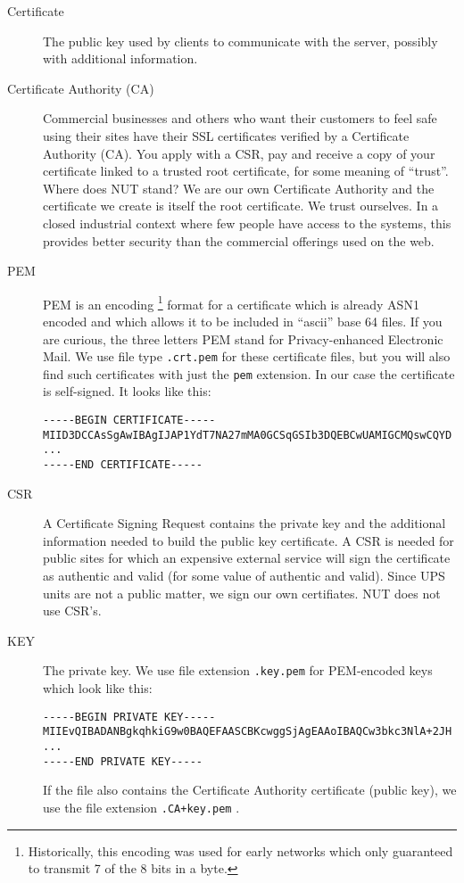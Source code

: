 \documentclass[12pt]{article}
\begin{document}
\begin{description}

\item[Certificate] The public key used by clients to communicate with
  the server, possibly with additional information.
  
\item[Certificate Authority (CA)] Commercial businesses and others who want
  their customers to feel safe using their sites have their SSL certificates
  verified by a Certificate Authority (CA). You apply with a CSR, pay and
  receive a copy of your certificate linked to a trusted root certificate, for
  some meaning of ``trust''.  Where does NUT stand?  We are our own
  Certificate Authority and the certificate we create is itself the root
  certificate.  We trust ourselves.  In a closed industrial context where few
  people have access to the systems, this provides better security than the
  commercial offerings used on the web.
  
\item[PEM] PEM is an encoding \footnote{Historically, this encoding was used
  for early networks which only guaranteed to transmit 7 of the 8 bits in a
  byte.}  format for a certificate which is already ASN1 encoded and which
  allows it to be included in ``ascii'' base 64 files.  If you are curious,
  the three letters PEM stand for Privacy-enhanced Electronic Mail.  We use
  file type \texttt{.crt.pem} for these certificate files, but you will also
  find such certificates with just the \texttt{pem} extension.  In our case
  the certificate is self-signed.  It looks like this:

\small{\begin{verbatim}
-----BEGIN CERTIFICATE-----
MIID3DCCAsSgAwIBAgIJAP1YdT7NA27mMA0GCSqGSIb3DQEBCwUAMIGCMQswCQYD
...
-----END CERTIFICATE-----
\end{verbatim}}

\item[CSR] A Certificate Signing Request contains the private key and the
  additional information needed to build the public key certificate.  A CSR is
  needed for public sites for which an expensive external service will sign
  the certificate as authentic and valid (for some value of authentic and
  valid).  Since UPS units are not a public matter, we sign our own
  certifiates.  NUT does not use CSR's.

\item[KEY] The private key.  We use file extension \texttt{.key.pem} for
  PEM-encoded keys which look like this:

\small{\begin{verbatim}
-----BEGIN PRIVATE KEY-----
MIIEvQIBADANBgkqhkiG9w0BAQEFAASCBKcwggSjAgEAAoIBAQCw3bkc3NlA+2JH
...
-----END PRIVATE KEY-----
\end{verbatim}}

If the file also contains the Certificate Authority certificate (public key),
we use the file extension \texttt{.CA+key.pem} .

\end{description}
\end{document}
